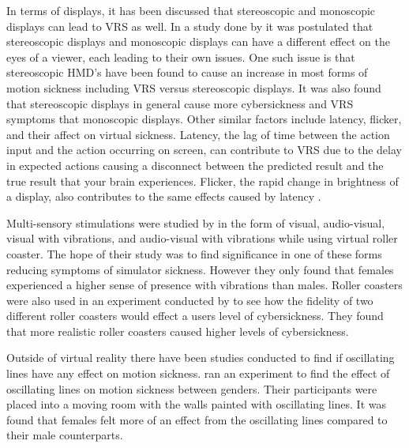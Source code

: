 \documentclass[sigconf]{acmart}
\begin{document}
In terms of displays, it has been discussed that stereoscopic and monoscopic displays can lead to VRS as well. In a study done by \cite{rebenitsch16} it was postulated that stereoscopic displays and monoscopic displays can have a different effect on the eyes of a viewer, each leading to their own issues. One such issue is that stereoscopic HMD's have been found to cause an increase in most forms of motion sickness including VRS versus stereoscopic displays. It was also found that stereoscopic displays in general cause more cybersickness and VRS symptoms that monoscopic displays. Other similar factors include latency, flicker, and their affect on virtual sickness\cite{ramaseri22}. Latency, the lag of time between the action input and the action occurring on screen, can contribute to VRS due to the delay in expected actions causing a disconnect between the predicted result and the true result that your brain experiences\cite{stauffert20, kim20}. Flicker, the rapid change in brightness of a display, also contributes to the same effects caused by latency \cite{laviola00}.

Multi-sensory stimulations were studied by \cite{grassini(1)21} in the form of visual, audio-visual, visual with vibrations, and audio-visual with vibrations while using virtual roller coaster. The hope of their study was to find significance in one of these forms reducing symptoms of simulator sickness. However they only found that females experienced a higher sense of presence with vibrations than males. Roller coasters were also used in an experiment conducted by \cite{davis15} to see how the fidelity of two different roller coasters would effect a users level of cybersickness. They found that more realistic roller coasters caused higher levels of cybersickness.

Outside of virtual reality there have been studies conducted to find if oscillating lines have any effect on motion sickness. \cite{koslucher15} ran an experiment to find the effect of oscillating lines on motion sickness between genders. Their participants were placed into a moving room with the walls painted with oscillating lines. It was found that females felt more of an effect from the oscillating lines compared to their male counterparts. 
\end{document}
